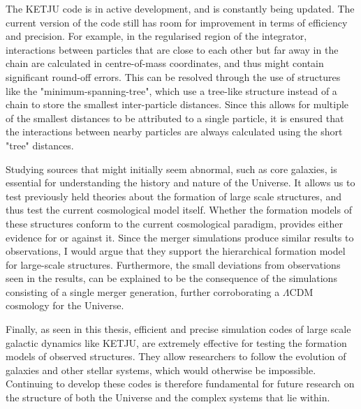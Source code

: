 \documentclass[english, twoside]{HYgradu}
\begin{document}
The KETJU code is in active development, and is constantly being updated. The current version of the code still has room for improvement in terms of efficiency and precision. For example, in the regularised region of the integrator, interactions between particles that are close to each other but far away in the chain are calculated in centre-of-mass coordinates, and thus might contain significant round-off errors. This can be resolved through the use of structures like the "minimum-spanning-tree", which use a tree-like structure instead of a chain to store the smallest inter-particle distances. Since this allows for multiple of the smallest distances to be attributed to a single particle, it is ensured that the interactions between nearby particles are always calculated using the short "tree" distances.

Studying sources that might initially seem abnormal, such as core galaxies, is essential for understanding the history and nature of the Universe. It allows us to test previously held theories about the formation of large scale structures, and thus test the current cosmological model itself. Whether the formation models of these structures conform to the current cosmological paradigm, provides either evidence for or against it. Since the merger simulations produce similar results to observations, I would argue that they support the hierarchical formation model for large-scale structures. Furthermore, the small deviations from observations seen in the results, can be explained to be the consequence of the simulations consisting of a single merger generation, further corroborating a $\Lambda \mathrm{CDM}$ cosmology for the Universe.

Finally, as seen in this thesis, efficient and precise simulation codes of large scale galactic dynamics like KETJU, are extremely effective for testing the formation models of observed structures. They allow researchers to follow the evolution of galaxies and other stellar systems, which would otherwise be impossible. Continuing to develop these codes is therefore fundamental for future research on the structure of both the Universe and the complex systems that lie within.




\newcommand{\apj}{The Astrophysical Journal}
\newcommand{\mnras}{Monthly Notices of the Royal Astronomical Society}
\newcommand{\apjs}{The Astrophysical Journal Supplement}
\newcommand{\nat}{Nature}
\newcommand{\aj}{The Astronomical Journal}
\newcommand{\na}{New Astronomy}
\newcommand{\araa}{Annual Review of Astronomy and Astrophysics}
\newcommand{\aap}{Astronomy and Astrophysics}
\newcommand{\apjl}{The Astrophysical Journal Letters}
\newcommand{\prl}{Physical Review Letters}
\newcommand{\ssr}{Space Science Reviews}
\newcommand{\prd}{Physical Review D}

\clearpage
{} %


\end{document}
